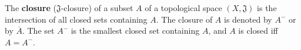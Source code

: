 The \textbf{closure} ($\mathfrak{J}$-closure) of a subset $A$ of a topological space $(X, \mathfrak{J})$ is the intersection of all closed sets containing $A$. The closure of $A$ is denoted by $A^{-}$ or by $\overline{A}$. The set $A^{-}$ is the smallest closed set containing $A$, and $A$ is closed iff $A = A^{-}$.

